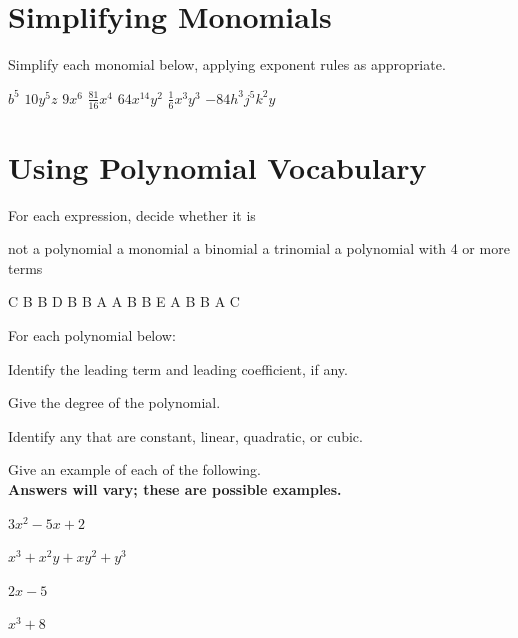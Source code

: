 \section*{Simplifying Monomials}
Simplify each monomial below, applying exponent rules as appropriate.
\begin{smenum}
\mitemxxxx
{$b^5$}
{$10y^5z$}
{$9x^6$}
{$\frac{81}{16}x^4$}
\mitemxxxo
{$64x^{14}y^2$}
{$\frac{1}{6}x^3y^3$}
{$-84h^3j^5k^2y$}
\end{smenum}

\section*{Using Polynomial Vocabulary}
For each expression, decide whether it is
\begin{Nmenum}
\mitemxxx
{not a polynomial}
{a monomial}
{a binomial}
\mitemxxo
{a trinomial}
{a polynomial with 4 or more terms}
\end{Nmenum}
\begin{smenum}
\mitemxxxx
{C}
{B}
{B}
{D}
\mitemxxxx
{B}
{B}
{A}
{A}
\mitemxxxx
{B}
{B}
{E}
{A}
\mitemxxxx
{B}
{B}
{A}
{C}
\end{smenum}
\clearpage
For each polynomial below:
\begin{clist}
\item Identify the leading term and leading coefficient, if any.
\item Give the degree of the polynomial.
\item Identify any that are constant, linear, quadratic, or cubic.
\end{clist}
\begin{senum}
\item{}
\item{}
\item{}
\item{}
\item{}
\item{}
\item{}
\item{}
\end{senum}
%
Give an example of each of the following.\\\textbf{Answers will vary; these are possible examples.}
\begin{senum}
\item $3x^2-5x+2$
\item $x^3+x^2y+xy^2+y^3$
\item $2x-5$
\item $x^3+8$
\end{senum}

